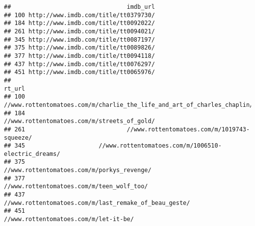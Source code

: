 \documentclass[]{article}
\begin{document}
\begin{verbatim}
##                                 imdb_url
## 100 http://www.imdb.com/title/tt0379730/
## 184 http://www.imdb.com/title/tt0092022/
## 261 http://www.imdb.com/title/tt0094021/
## 345 http://www.imdb.com/title/tt0087197/
## 375 http://www.imdb.com/title/tt0089826/
## 377 http://www.imdb.com/title/tt0094118/
## 437 http://www.imdb.com/title/tt0076297/
## 451 http://www.imdb.com/title/tt0065976/
##                                                                      rt_url
## 100 //www.rottentomatoes.com/m/charlie_the_life_and_art_of_charles_chaplin/
## 184                             //www.rottentomatoes.com/m/streets_of_gold/
## 261                             //www.rottentomatoes.com/m/1019743-squeeze/
## 345                     //www.rottentomatoes.com/m/1006510-electric_dreams/
## 375                              //www.rottentomatoes.com/m/porkys_revenge/
## 377                               //www.rottentomatoes.com/m/teen_wolf_too/
## 437                   //www.rottentomatoes.com/m/last_remake_of_beau_geste/
## 451                                   //www.rottentomatoes.com/m/let-it-be/
\end{verbatim}
\end{document}
